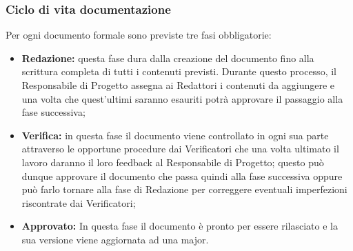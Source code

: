 		\subsubsection{Ciclo di vita documentazione}
			Per ogni documento formale sono previste tre fasi obbligatorie:
			\begin{itemize}
			\item \textbf{Redazione:} questa fase dura dalla creazione del documento fino alla scrittura completa di tutti i contenuti previsti. Durante questo processo, il Responsabile di Progetto assegna ai Redattori i contenuti da aggiungere e una volta che quest'ultimi saranno esauriti potrà approvare il passaggio alla fase successiva;
			\item \textbf{Verifica:} in questa fase il documento viene controllato in ogni sua parte attraverso le opportune procedure dai Verificatori che una volta ultimato il lavoro daranno il loro feedback al Responsabile di Progetto; questo può dunque approvare il documento che passa quindi alla fase successiva oppure può farlo tornare alla fase di Redazione per correggere eventuali imperfezioni riscontrate dai Verificatori;
			\item \textbf{Approvato:} In questa fase il documento è pronto per essere rilasciato e la sua versione viene aggiornata ad una major.
			\end{itemize}
